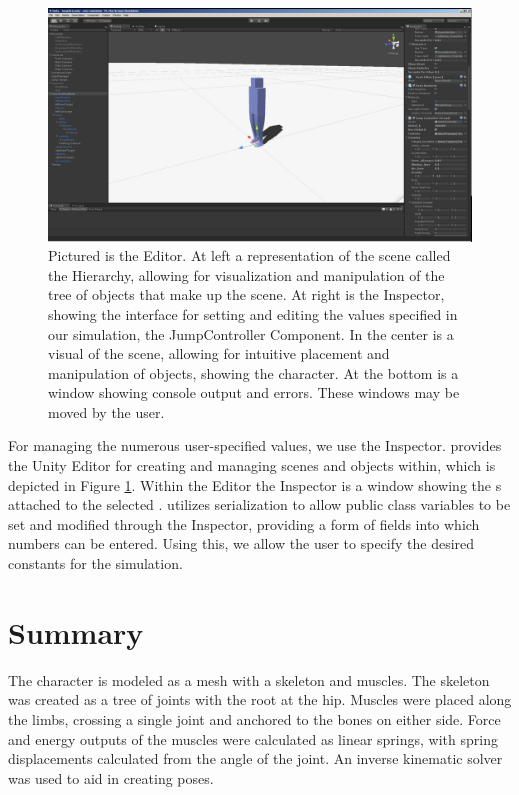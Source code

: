 	\begin{figure}[ht]
		\centering
		\includegraphics[width=\textwidth]{images/unityEditor.png}
		\caption[Screenshot of the \unity{} Editor]{Pictured is the \unity{} Editor.  At left a representation of the scene called the Hierarchy, allowing for visualization and manipulation of the tree of objects that make up the scene.  At right is the Inspector, showing the interface for setting and editing the values specified in our simulation, the JumpController Component.  In the center is a visual of the scene, allowing for intuitive placement and manipulation of objects, showing the character.  At the bottom is a window showing console output and errors.  These windows may be moved by the user.}
		\label{fig:unity_interface}
	\end{figure}	
	
	For managing the numerous user-specified values, we use the \unity{} Inspector.  \unity{} provides the Unity Editor for creating and managing scenes and objects within, which is depicted in Figure \ref{fig:unity_interface}.  Within the Editor the Inspector is a window showing the s attached to the selected .  \unity{} utilizes serialization to allow public class variables to be set and modified through the Inspector, providing a form of fields into which numbers can be entered.  Using this, we allow the user to specify the desired constants for the simulation.

\section{Summary}
\label{subsection:animation_summary}
The character is modeled as a mesh with a skeleton and muscles.   The skeleton was created as a tree of joints with the root at the hip.  Muscles were placed along the limbs, crossing a single joint and anchored to the bones on either side.  Force and energy outputs of the muscles were calculated as linear springs, with spring displacements calculated from the angle of the joint.  An inverse kinematic solver was used to aid in creating poses.

